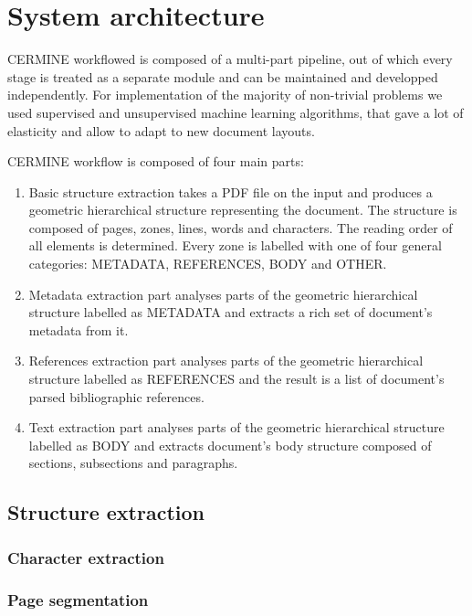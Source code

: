 \chapter{System architecture}
CERMINE workflowed is composed of a multi-part pipeline, out of which every stage is treated as a separate module and can be maintained and developped independently. For implementation of the majority of non-trivial problems we used supervised and unsupervised machine learning algorithms, that gave a lot of elasticity and allow to adapt to new document layouts.

CERMINE workflow is composed of four main parts:
\begin{enumerate}
    \item Basic structure extraction takes a PDF file on the input and produces a geometric hierarchical structure representing the document. The structure is composed of pages, zones, lines, words and characters. The reading order of all elements is determined. Every zone is labelled with one of four general categories: METADATA, REFERENCES, BODY and OTHER.
    \item Metadata extraction part analyses parts of the geometric hierarchical structure labelled as METADATA and extracts a rich set of document's metadata from it.
    \item References extraction part analyses parts of the geometric hierarchical structure labelled as REFERENCES and the result is a list of document's parsed bibliographic references.
    \item Text extraction part analyses parts of the geometric hierarchical structure labelled as BODY and extracts document's body structure composed of sections, subsections and paragraphs. 
\end{enumerate}
\section{Structure extraction}
\subsection{Character extraction}
\subsection{Page segmentation}
